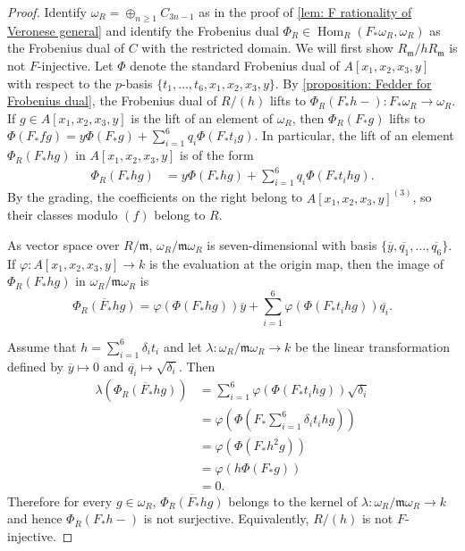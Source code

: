\documentclass[reqno,11pt]{amsart}
\numberwithin{equation}{section}
\theoremstyle{definition}
\theoremstyle{definition}
\theoremstyle{definition}
\theoremstyle{remark}
\newcommand{\Hom}{\operatorname{Hom}}
\newcommand{\fm}{\mathfrak{m}}
\begin{document}
\begin{proof}
    Identify $\omega_R = \oplus_{n\geq 1} C_{3n-1}$ as in the proof of \cref{lem: F rationality of Veronese general} and identify the Frobenius dual $\Phi_R\in\Hom_R(F_*\omega_R,\omega_R)$ as the Frobenius dual of $C$ with the restricted domain. We will first show $R_{\fm}/hR_{\fm}$ is not $F$-injective. Let $\Phi$ denote the standard Frobenius dual of $A[x_1,x_2,x_3,y]$ with respect to the $p$-basis $\{t_1,\ldots,t_6,x_1,x_2,x_3,y\}$. By \cref{proposition: Fedder for Frobenius dual}, the Frobenius dual of $R/(h)$ lifts to $\Phi_R(F_*h-):F_*\omega_R\to \omega_R$. If $g\in A[x_1,x_2,x_3,y]$ is the lift of an element of $\omega_R$, then $\Phi_R(F_*g)$ lifts to $\Phi(F_*fg) = y\Phi(F_*g) + \sum_{i=1}^6q_i\Phi(F_*t_ig)$. In particular, the lift of an element $\Phi_R(F_*hg)$ in $A[x_1,x_2,x_3,y]$ is of the form
    \begin{align*}
    \Phi_R(F_*hg) &= y\Phi(F_*hg) + \sum_{i=1}^6q_i\Phi(F_*t_ihg).
    \end{align*}
    By the grading, the coefficients on the right belong to $A[x_1,x_2,x_3,y]^{(3)}$, so their classes modulo $(f)$ belong to $R$.
    
    As vector space over $R/\fm$, $\omega_R/\fm\omega_R$ is seven-dimensional with basis $\{\overline{y},\overline{q_1},\ldots,\overline{q_6}\}$. If $\varphi: A[x_1,x_2,x_3,y]\to k$ is the evaluation at the origin map, then the image of $\Phi_R(F_*hg)$ in $\omega_R/\fm\omega_R$ is
    \[
    \overline{\Phi_R(F_*hg)} = \varphi(\Phi(F_*hg))\overline{y} +  \sum_{i=1}^6\varphi(\Phi(F_*t_ihg))\overline{q_i}.
    \]

    Assume that $h=\sum_{i=1}^6\delta_it_i$ and let $\lambda: \omega_R/\fm\omega_R\to k$ be the linear transformation defined by $\overline{y}\mapsto 0$ and $\overline{q_i}\mapsto \sqrt{\delta_i}$. Then
    \begin{align*}
    \lambda\left(\overline{\Phi_R(F_*hg)}\right) &= \sum_{i=1}^6 \varphi(\Phi(F_*t_ihg))\sqrt{\delta_i}\\
    &=\varphi\left(\Phi\left(F_*\sum_{i=1}^6\delta_it_ihg\right)\right)\\
    &=\varphi(\Phi(F_*h^2g))\\
    &=\varphi(h\Phi(F_*g))\\
    &=0.
    \end{align*}
    Therefore for every $g\in \omega_R$, $\overline{\Phi_R(F_*hg)}$ belongs to the kernel of $\lambda: \omega_R/\fm\omega_R\to k$ and hence $\Phi_R(F_*h-)$ is not surjective. Equivalently, $R/(h)$ is not $F$-injective.


\end{proof}
\end{document}
